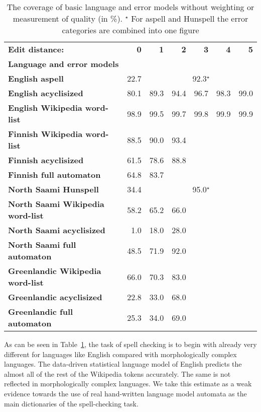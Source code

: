 \documentclass[a4paper,12pt]{article}
\begin{document}
\begin{table}
    \centering
    \begin{tabular}{|l|r|r|r|r|r|r|}
        \hline
        \bf Edit distance: & \bf 0 & \bf 1 & \bf 2 & \bf 3 & \bf 4 & \bf 5 \\
        \bf Language and error models & & & & & & \\
        \hline
    \bf English aspell & 22.7 & \multicolumn{5}{|c|}{92.3$^\star$} \\
        \bf English acyclisized & 80.1 & 89.3 & 94.4 & 96.7 & 98.3 & 99.0 \\
            \bf English Wikipedia word-list & 98.9 & 99.5 & 99.7 & 99.8 & 99.9 & 99.9 \\
        \hline
                   \bf Finnish Wikipedia word-list & 88.5 & 90.0 & 93.4 & & & \\
                  \bf Finnish acyclisized & 61.5 & 78.6 & 88.8 & & & \\
                  \bf Finnish full automaton & 64.8 & 83.7 & & & & \\
        \hline
        \bf North Saami Hunspell & 34.4 & \multicolumn{5}{|c|}{95.0$^\star$} \\
        \bf North Saami Wikipedia word-list & 58.2 & 65.2 & 66.0 & & & \\
               \bf North Saami acyclisized & 1.0 & 18.0 & 28.0 & & & \\
               \bf North Saami full automaton & 48.5 & 71.9 & 92.0 & & & \\
        \hline
        \bf Greenlandic Wikipedia word-list & 66.0 & 70.3 & 83.0 & & & \\
                 \bf Greenlandic acyclisized & 22.8 & 33.0 & 68.0 & & & \\
                  \bf Greenlandic full automaton & 25.3 & 34.0 & 69.0 & & & \\
        \hline
    \end{tabular}
    \caption{The coverage of basic language and error models without weighting
        or measurement of quality (in \%).
    $^\star$ For aspell and Hunspell the error categories are combined into one
    figure\label{table:coverage}}
\end{table}

As can be seen in Table~\ref{table:coverage}, the task of spell checking is to
begin with already very different for languages like English compared
with morphologically complex languages. The data-driven statistical language
model of English predicts the almost all of the rest of the Wikipedia tokens
accurately. The same is not reflected in morphologically complex languages. We
take this estimate as a weak evidence towards the use of real hand-written
language model automata as the main dictionaries of the spell-checking task.
\end{document}
